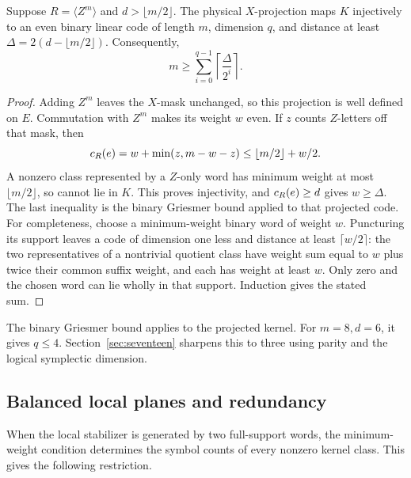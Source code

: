 \begin{proposition}\label{prop:griesmer}
Suppose \(R=\langle Z^m\rangle\) and \(d>\lfloor m/2\rfloor\).
The physical \(X\)-projection maps \(K\) injectively to an even binary
linear code of length \(m\), dimension \(q\), and distance at least
\(\Delta=2(d-\lfloor m/2\rfloor)\). Consequently,
\begin{equation}\label{eq:griesmer}
 m\geq\sum_{i=0}^{q-1}\left\lceil\frac{\Delta}{2^i}\right\rceil.
\end{equation}
\end{proposition}
\begin{proof}
Adding \(Z^m\) leaves the \(X\)-mask unchanged, so this projection is
well defined on \(E\). Commutation with \(Z^m\) makes its weight
\(w\) even. If \(z\) counts \(Z\)-letters off that mask, then
\[
 c_R(e)=w+\min(z,m-w-z)\leq\lfloor m/2\rfloor+w/2.
\]
A nonzero class represented by a \(Z\)-only word has minimum weight at most \(\lfloor m/2\rfloor\),
so cannot lie in \(K\). This proves injectivity, and
\(c_R(e)\geq d\) gives \(w\geq\Delta\).
The last inequality is the binary Griesmer bound applied to that projected
code. For completeness, choose a minimum-weight binary word of weight
\(w\). Puncturing its support leaves a code of dimension one less and
distance at least \(\lceil w/2\rceil\): the two representatives of a
nontrivial quotient class have weight sum equal to \(w\) plus twice
their common suffix weight, and each has weight at least \(w\).
Only zero and the chosen word can lie wholly in that support. Induction
gives the stated sum.
\end{proof}

The binary Griesmer bound applies to the projected kernel. For \(m=8,d=6\), it gives \(q\leq4\).
Section~\ref{sec:seventeen} sharpens this to three using parity and the
logical symplectic dimension.

\subsection{Balanced local planes and redundancy}

When the local stabilizer is generated by two full-support words, the
minimum-weight condition determines the symbol counts of every nonzero
kernel class. This gives the following restriction.

